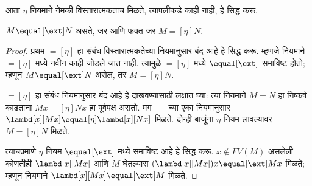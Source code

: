 \documentclass[../../../include/open-logic-section]{subfiles}
\begin{document}
आता $\eta$ नियमाने नेमकी विस्तारात्मकताच मिळते,
त्यापलीकडे काही नाही, हे सिद्ध करू.

\begin{thm}
  $M \equal[\ext] N$ असते, जर आणि फक्त जर $M \equal[\eta] N$.
\end{thm}

\begin{proof}
  प्रथम $\equal[\eta]$ हा संबंध विस्तारात्मकतेच्या
  नियमानुसार बंद आहे हे सिद्ध करू. म्हणजे \ext{} नियमाने
  $\equal[\eta]$ मध्ये नवीन काही जोडले जात नाही. त्यामुळे
  $\equal[\eta]$ मध्ये $\equal[\ext]$ समाविष्ट होतो;
  म्हणून $M \equal[\ext] N$ असेल, तर $M \equal[\eta] N$.

  $\equal[\eta]$ हा संबंध \ext{} नियमानुसार बंद आहे
  हे दाखवण्यासाठी लक्षात घ्या: त्या \ext{} नियमाने $M
  \equal N$ हा निष्कर्ष काढताना $Mx
  \equal[\eta] Nx$ हा पूर्वपक्ष असतो. मग $\equal$ च्या
  एका नियमानुसार $\lambd[x][Mx]
  \equal[\eta] \lambd[x][Nx]$ मिळते. दोन्ही बाजूंना
  $\eta$ नियम लावल्यावर $M \equal[\eta] N$ मिळते.

  त्याचप्रमाणे $\eta$ नियम $\equal[\ext]$ मध्ये
  समाविष्ट आहे हे सिद्ध करू. $x \notin
  FV(M)$ असलेली कोणतीही $\lambd[x][Mx]$ आणि $M$
  घेतल्यास $(\lambd[x][Mx])x \equal[\ext] Mx$ मिळते;
  म्हणून \ext{} नियमाने
  $\lambd[x][Mx] \equal[\ext] M$ मिळते.
\end{proof}
\end{document}
